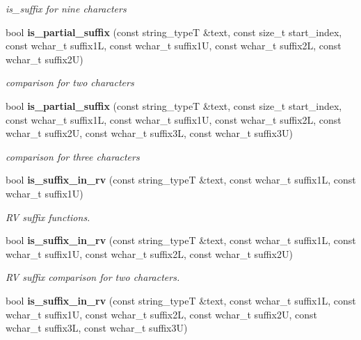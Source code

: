 \begin{DoxyCompactItemize}
\begin{DoxyCompactList}\small\item\em is\+\_\+suffix for nine characters \end{DoxyCompactList}\item 
bool {\bf is\+\_\+partial\+\_\+suffix} (const string\+\_\+typeT \&text, const size\+\_\+t start\+\_\+index, const wchar\+\_\+t suffix1L, const wchar\+\_\+t suffix1U, const wchar\+\_\+t suffix2L, const wchar\+\_\+t suffix2U)\label{classstemming_1_1stem_a2ae63cf92bc4f4f40f0093e4842a235f}

\begin{DoxyCompactList}\small\item\em comparison for two characters \end{DoxyCompactList}\item 
bool {\bf is\+\_\+partial\+\_\+suffix} (const string\+\_\+typeT \&text, const size\+\_\+t start\+\_\+index, const wchar\+\_\+t suffix1L, const wchar\+\_\+t suffix1U, const wchar\+\_\+t suffix2L, const wchar\+\_\+t suffix2U, const wchar\+\_\+t suffix3L, const wchar\+\_\+t suffix3U)\label{classstemming_1_1stem_a728ea4e26737b04d04e02bea863f29e4}

\begin{DoxyCompactList}\small\item\em comparison for three characters \end{DoxyCompactList}\item 
bool {\bf is\+\_\+suffix\+\_\+in\+\_\+rv} (const string\+\_\+typeT \&text, const wchar\+\_\+t suffix1L, const wchar\+\_\+t suffix1U)
\begin{DoxyCompactList}\small\item\em RV suffix functions. \end{DoxyCompactList}\item 
bool {\bf is\+\_\+suffix\+\_\+in\+\_\+rv} (const string\+\_\+typeT \&text, const wchar\+\_\+t suffix1L, const wchar\+\_\+t suffix1U, const wchar\+\_\+t suffix2L, const wchar\+\_\+t suffix2U)\label{classstemming_1_1stem_a359356fbaafc3c7154d94fda6916ffa0}

\begin{DoxyCompactList}\small\item\em RV suffix comparison for two characters. \end{DoxyCompactList}\item 
bool {\bf is\+\_\+suffix\+\_\+in\+\_\+rv} (const string\+\_\+typeT \&text, const wchar\+\_\+t suffix1L, const wchar\+\_\+t suffix1U, const wchar\+\_\+t suffix2L, const wchar\+\_\+t suffix2U, const wchar\+\_\+t suffix3L, const wchar\+\_\+t suffix3U)\label{classstemming_1_1stem_a00fa5d00ff53320a437fe96a5bfa8f44}


\end{DoxyCompactItemize}
